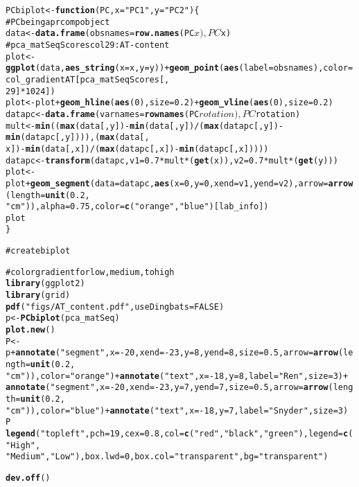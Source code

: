 \documentclass{article}\usepackage{graphicx, color}
\makeatletter
\newcommand{\hlfunctioncall}[1]{\textcolor[rgb]{0.501960784313725,0,0.329411764705882}{\textbf{#1}}}%
\newcommand{\hlstring}[1]{\textcolor[rgb]{0.6,0.6,1}{#1}}%
\newcommand{\hlcomment}[1]{\textcolor[rgb]{0.180392156862745,0.6,0.341176470588235}{#1}}%
\newenvironment{kframe}{%
 \def\at@end@of@kframe{}%
 \ifinner\ifhmode%
  \def\at@end@of@kframe{\end{minipage}}%
  \begin{minipage}{\columnwidth}%
 \fi\fi%
 \def\FrameCommand##1{\hskip\@totalleftmargin \hskip-\fboxsep
 \colorbox{shadecolor}{##1}\hskip-\fboxsep
     \hskip-\linewidth \hskip-\@totalleftmargin \hskip\columnwidth}%
 \MakeFramed {\advance\hsize-\width
   \@totalleftmargin\z@ \linewidth\hsize
   \@setminipage}}%
 {\par\unskip\endMakeFramed%
 \at@end@of@kframe}
\newenvironment{knitrout}{}{} %
\makeatother
\begin{document}
\begin{knitrout}
\begin{kframe}
\begin{alltt}
PCbiplot <- \hlfunctioncall{function}(PC, x = \hlstring{"PC1"}, y = \hlstring{"PC2"}) \{
\hlcomment{    # PC being a prcomp object}
    data <- \hlfunctioncall{data.frame}(obsnames = \hlfunctioncall{row.names}(PC$x), PC$x)
\hlcomment{    # pca_matSeqScores col 29: AT-content}
    plot <- \hlfunctioncall{ggplot}(data, \hlfunctioncall{aes_string}(x = x, y = y)) + \hlfunctioncall{geom_point}(\hlfunctioncall{aes}(label = obsnames), color = col_gradientAT[pca_matSeqScores[, 
        29] * 1024])
    plot <- plot + \hlfunctioncall{geom_hline}(\hlfunctioncall{aes}(0), size = 0.2) + \hlfunctioncall{geom_vline}(\hlfunctioncall{aes}(0), size = 0.2)
    datapc <- \hlfunctioncall{data.frame}(varnames = \hlfunctioncall{rownames}(PC$rotation), PC$rotation)
    mult <- \hlfunctioncall{min}((\hlfunctioncall{max}(data[, y]) - \hlfunctioncall{min}(data[, y])/(\hlfunctioncall{max}(datapc[, y]) - \hlfunctioncall{min}(datapc[, y]))), (\hlfunctioncall{max}(data[, 
        x]) - \hlfunctioncall{min}(data[, x])/(\hlfunctioncall{max}(datapc[, x]) - \hlfunctioncall{min}(datapc[, x]))))
    datapc <- \hlfunctioncall{transform}(datapc, v1 = 0.7 * mult * (\hlfunctioncall{get}(x)), v2 = 0.7 * mult * (\hlfunctioncall{get}(y)))
    plot <- plot + \hlfunctioncall{geom_segment}(data = datapc, \hlfunctioncall{aes}(x = 0, y = 0, xend = v1, yend = v2), arrow = \hlfunctioncall{arrow}(length = \hlfunctioncall{unit}(0.2, 
        \hlstring{"cm"})), alpha = 0.75, color = \hlfunctioncall{c}(\hlstring{"orange"}, \hlstring{"blue"})[lab_info])
    plot
\}

\hlcomment{# create biplot}

\hlcomment{# color gradient for low, medium, to high}
\hlfunctioncall{library}(ggplot2)
\hlfunctioncall{library}(grid)
\hlfunctioncall{pdf}(\hlstring{"figs/AT_content.pdf"}, useDingbats = FALSE)
p <- \hlfunctioncall{PCbiplot}(pca_matSeq)
\hlfunctioncall{plot.new}()
P <- p + \hlfunctioncall{annotate}(\hlstring{"segment"}, x = -20, xend = -23, y = 8, yend = 8, size = 0.5, arrow = \hlfunctioncall{arrow}(length = \hlfunctioncall{unit}(0.2, 
    \hlstring{"cm"})), color = \hlstring{"orange"}) + \hlfunctioncall{annotate}(\hlstring{"text"}, x = -18, y = 8, label = \hlstring{"Ren"}, size = 3) + 
    \hlfunctioncall{annotate}(\hlstring{"segment"}, x = -20, xend = -23, y = 7, yend = 7, size = 0.5, arrow = \hlfunctioncall{arrow}(length = \hlfunctioncall{unit}(0.2, 
        \hlstring{"cm"})), color = \hlstring{"blue"}) + \hlfunctioncall{annotate}(\hlstring{"text"}, x = -18, y = 7, label = \hlstring{"Snyder"}, size = 3)
P
\hlfunctioncall{legend}(\hlstring{"topleft"}, pch = 19, cex = 0.8, col = \hlfunctioncall{c}(\hlstring{"red"}, \hlstring{"black"}, \hlstring{"green"}), legend = \hlfunctioncall{c}(\hlstring{"High"}, 
    \hlstring{"Medium"}, \hlstring{"Low"}), box.lwd = 0, box.col = \hlstring{"transparent"}, bg = \hlstring{"transparent"})

\hlfunctioncall{dev.off}()
\end{alltt}
\end{kframe}
\end{knitrout}
\end{document}
